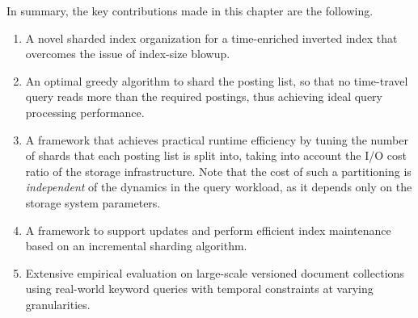 
In summary, the key contributions made in this chapter are the following.

\begin{enumerate}
	\item A novel sharded index organization for a
	  time-enriched inverted index that overcomes the issue of
	  index-size blowup.

	\item An optimal greedy algorithm to shard the posting list, so that no time-travel query reads more than the required postings, thus achieving ideal query processing performance.

	\item A framework that achieves practical runtime efficiency by tuning the number of shards that each posting list is split into, taking into
	  account the I/O cost ratio of the storage infrastructure. Note
	  that the cost of such a partitioning is \emph{independent} of the dynamics in the
	  query workload, as it depends only on the storage system parameters.

    \item A framework to support updates and perform efficient index maintenance based on an incremental sharding algorithm.

    \item Extensive empirical evaluation on large-scale versioned
	document collections using real-world keyword queries with temporal constraints at varying granularities. 

\end{enumerate}

